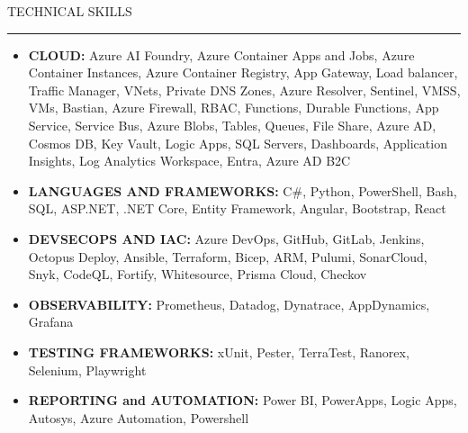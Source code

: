 \documentclass[letterpaper,10pt]{article}
\newcommand{\ResumeSection}[1]{\par{\fontsize{11pt}{13pt}\selectfont \MakeUppercase{#1}}\vspace{1pt}\hrule height 0.6pt}
\begin{document}
\ResumeSection{Technical Skills}\vspace{2pt}
\begin{itemize}[leftmargin=0.15in, label={}, itemsep=1pt, topsep=0pt, parsep=0pt]
  \item{\textbf{CLOUD:} Azure AI Foundry, Azure Container Apps and Jobs, Azure Container Instances, Azure Container Registry, App Gateway, Load balancer, Traffic Manager, VNets, Private DNS Zones, Azure Resolver, Sentinel, VMSS, VMs, Bastian, Azure Firewall, RBAC, Functions, Durable Functions, App Service, Service Bus, Azure Blobs, Tables, Queues, File Share, Azure AD, Cosmos DB, Key Vault, Logic Apps, SQL Servers, Dashboards, Application Insights, Log Analytics Workspace, Entra, Azure AD B2C}
  \item{\textbf{LANGUAGES AND FRAMEWORKS:} C\#, Python, PowerShell, Bash, SQL, ASP.NET, .NET Core, Entity Framework, Angular, Bootstrap, React}
  \item{\textbf{DEVSECOPS AND IAC:} Azure DevOps, GitHub, GitLab, Jenkins, Octopus Deploy, Ansible, Terraform, Bicep, ARM, Pulumi, SonarCloud, Snyk, CodeQL, Fortify, Whitesource, Prisma Cloud, Checkov}
  \item{\textbf{OBSERVABILITY:} Prometheus, Datadog, Dynatrace, AppDynamics, Grafana}
  \item{\textbf{TESTING FRAMEWORKS:} xUnit, Pester, TerraTest, Ranorex, Selenium, Playwright}
  \item{\textbf{REPORTING and AUTOMATION:} Power BI, PowerApps, Logic Apps, Autosys, Azure Automation, Powershell}
\end{itemize}
\end{document}
